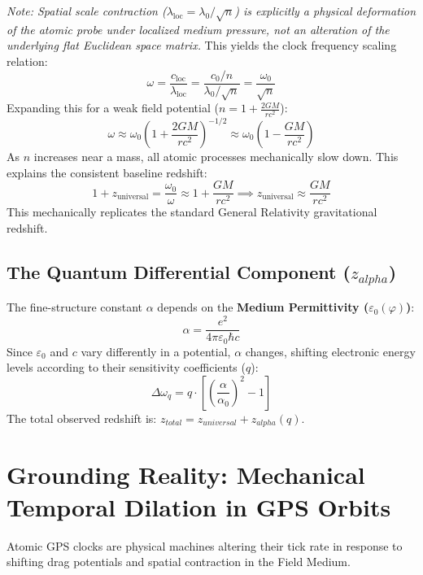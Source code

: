 \documentclass[reprint,amsmath,amssymb,aps,prd,twocolumn]{revtex4-2}
\begin{document}
\textit{Note: Spatial scale contraction ($\lambda_{\text{loc}} = \lambda_0/\sqrt{n}$) is explicitly a physical deformation of the atomic probe under localized medium pressure, not an alteration of the underlying flat Euclidean space matrix.}
This yields the clock frequency scaling relation:
\begin{equation}
\omega = \frac{c_{\text{loc}}}{\lambda_{\text{loc}}} = \frac{c_0 / n}{\lambda_0 / \sqrt{n}} = \frac{\omega_0}{\sqrt{n}}
\end{equation}
Expanding this for a weak field potential ($n = 1 + \frac{2GM}{rc^2}$):
\begin{equation}
\omega \approx \omega_0 \left( 1 + \frac{2GM}{rc^2} \right)^{-1/2} \approx \omega_0 \left( 1 - \frac{GM}{rc^2} \right)
\end{equation}
As $n$ increases near a mass, all atomic processes mechanically slow down. This explains the consistent baseline redshift:
\begin{equation}
1 + z_{\text{universal}} = \frac{\omega_0}{\omega} \approx 1 + \frac{GM}{rc^2} \implies z_{\text{universal}} \approx \frac{GM}{rc^2}
\end{equation}
This mechanically replicates the standard General Relativity gravitational redshift.

\subsection{The Quantum Differential Component ($z_{alpha}$)}
The fine-structure constant $\alpha$ depends on the \textbf{Medium Permittivity ($\varepsilon_0(\varphi)$)}:
\begin{equation}
\alpha = \frac{e^2}{4\pi \varepsilon_0 \hbar c}
\end{equation}
Since $\varepsilon_0$ and $c$ vary differently in a potential, $\alpha$ changes, shifting electronic energy levels according to their sensitivity coefficients ($q$):
\begin{equation}
\Delta \omega_{q} = q \cdot \left[ \left( \frac{\alpha}{\alpha_0} \right)^2 - 1 \right]
\end{equation}
The total observed redshift is: $z_{total} = z_{universal} + z_{alpha}(q)$.

\section{Grounding Reality: Mechanical Temporal Dilation in GPS Orbits}

Atomic GPS clocks are physical machines altering their tick rate in response to shifting drag potentials and spatial contraction in the Field Medium.
\end{document}
